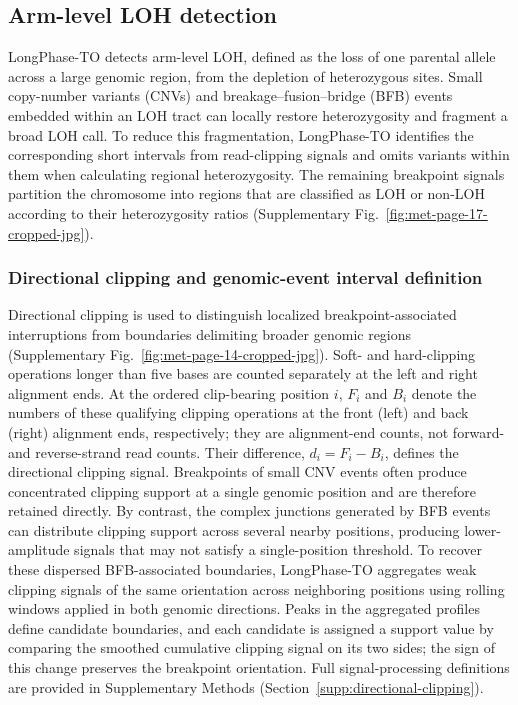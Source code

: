 \documentclass[pdflatex,sn-nature]{sn-jnl}
\begin{document}
\subsection{Arm-level LOH detection}

LongPhase-TO detects arm-level LOH, defined as the loss of one parental allele across a large genomic region, from the depletion of heterozygous sites. Small copy-number variants (CNVs) and breakage--fusion--bridge (BFB) events embedded within an LOH tract can locally restore heterozygosity and fragment a broad LOH call. To reduce this fragmentation, LongPhase-TO identifies the corresponding short intervals from read-clipping signals and omits variants within them when calculating regional heterozygosity. The remaining breakpoint signals partition the chromosome into regions that are classified as LOH or non-LOH according to their heterozygosity ratios (Supplementary Fig.~\ref{fig:met-page-17-cropped-jpg}).

\subsubsection{Directional clipping and genomic-event interval definition}

Directional clipping is used to distinguish localized breakpoint-associated interruptions from boundaries delimiting broader genomic regions (Supplementary Fig.~\ref{fig:met-page-14-cropped-jpg}). Soft- and hard-clipping operations longer than five bases are counted separately at the left and right alignment ends. At the ordered clip-bearing position \(i\), \(F_i\) and \(B_i\) denote the numbers of these qualifying clipping operations at the front (left) and back (right) alignment ends, respectively; they are alignment-end counts, not forward- and reverse-strand read counts. Their difference, \(d_i=F_i-B_i\), defines the directional clipping signal.
Breakpoints of small CNV events often produce concentrated clipping support at a single genomic position and are therefore retained directly. By contrast, the complex junctions generated by BFB events can distribute clipping support across several nearby positions, producing lower-amplitude signals that may not satisfy a single-position threshold. To recover these dispersed BFB-associated boundaries, LongPhase-TO aggregates weak clipping signals of the same orientation across neighboring positions using rolling windows applied in both genomic directions. Peaks in the aggregated profiles define candidate boundaries, and each candidate is assigned a support value by comparing the smoothed cumulative clipping signal on its two sides; the sign of this change preserves the breakpoint orientation. Full signal-processing definitions are provided in Supplementary Methods (Section~\ref{supp:directional-clipping}).
\end{document}
